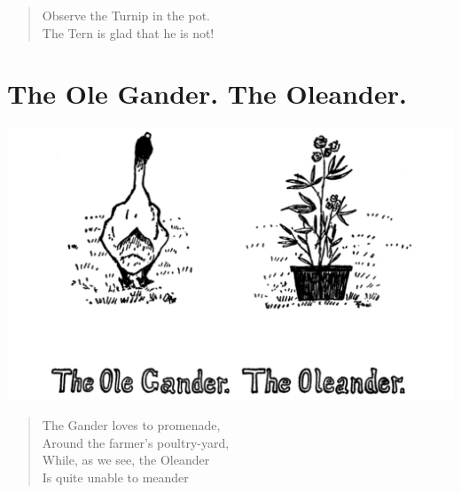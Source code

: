 \documentclass[letterpaper, 10pt, openany]{memoir}
\begin{document}
\begin{verse}\huge
Observe the Turnip in the pot.\\
The Tern is glad that he is not!\\
\end{verse}

\chapter{The Ole Gander. The Oleander.}
\includegraphics[width=1\textwidth]{f-p14.png}
\vspace{\onelineskip}
\begin{verse}\huge
The Gander loves to promenade,\\
Around the farmer's poultry-yard,\\
While, as we see, the Oleander\\
Is quite unable to meander\\
\end{verse}
\end{document}
